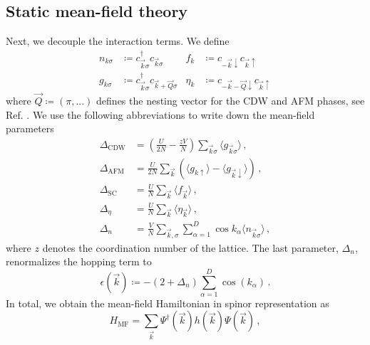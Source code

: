 \documentclass[
    reprint, 
    aps,
    preprintnumbers,
    twocolumn,
    prb,
    superscriptaddress
]{revtex4-2}
\newcommand{\vk}{\vec{k}}
\newcommand{\vQ}{\vec{Q}}
\newcommand{\up}{\uparrow}
\newcommand{\down}{\downarrow}
\begin{document}
\subsection{Static mean-field theory}

Next, we decouple the interaction terms.
We define 
\begin{equation}
    \label{eqn:operators}
    \begin{aligned}
        n_{k\sigma} &\coloneqq  c_{\vk\sigma}^\dagger c_{\vk\sigma}      &f_k     &\coloneqq  c_{-\vk\down} c_{\vk\up} \\
        g_{k\sigma} &\coloneqq  c_{\vk\sigma}^\dagger c_{\vk+\vQ\sigma}  &\eta_k  &\coloneqq  c_{-\vk-\vQ\down} c_{\vk\up}
    \end{aligned}
\end{equation}
where $\vQ \coloneqq  (\pi, ...)$ defines the nesting vector for the CDW and AFM phases, see Ref. \cite{sentef17}.
We use the following abbreviations to write down the mean-field parameters
\begin{subequations}
    \begin{align}
        \label{eqn:delta_cdw}
        \Delta_\text{CDW} &= \left(\frac{U}{2N} - \frac{zV}{N}\right) \sum_{\vk\sigma} \langle g_{\vk\sigma} \rangle\,, \\
        \label{eqn:delta_afm}
        \Delta_\text{AFM} &= \frac{U}{2N} \sum_{\vk} \left( \langle g_{k\uparrow} \rangle - \langle g_{\vk\downarrow} \rangle \right)\,, \\
        \Delta_\text{SC} &= \frac{U}{N} \sum_{\vk} \langle f_{\vk} \rangle\,, \\
        \Delta_\eta &= \frac{U}{N} \sum_{\vk} \langle \eta_{\vk} \rangle\,, \\
        \Delta_n &= \frac{V}{N} \sum_{\vk,\sigma} \sum_{\alpha=1}^D \cos k_\alpha \langle n_{\vk\sigma} \rangle\,,
    \end{align}
\end{subequations}
where $z$ denotes the coordination number of the lattice.
The last parameter, $\Delta_n$, renormalizes the hopping term to
\begin{equation}
    \epsilon( \vk ) \coloneqq  -(2 + \Delta_n) \sum_{\alpha=1}^D \cos(k_\alpha)\,.
\end{equation}
In total, we obtain the mean-field Hamiltonian in spinor representation as
\begin{equation}
    \label{eqn:mf_hamiltonian}
    H_\text{MF} = \sum_{\vk} \Psi^\dagger (\vk) h(\vk) \Psi (\vk)\,,
\end{equation}
\end{document}
